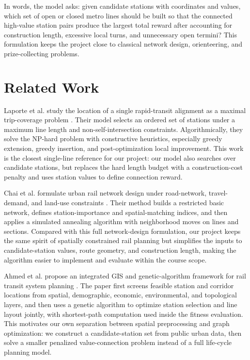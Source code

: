 \documentclass[9pt,a4paper,twocolumn,twoside]{tau-class/tau}
\begin{document}
    In words, the model asks: given candidate stations with coordinates and values, which set of open or closed metro lines should be built so that the connected high-value station pairs produce the largest total reward after accounting for construction length, excessive local turns, and unnecessary open termini? This formulation keeps the project close to classical network design, orienteering, and prize-collecting problems.

    \section{Related Work}

    Laporte et al. study the location of a single rapid-transit alignment as a maximal trip-coverage problem \cite{laporte2005tripcoverage}. Their model selects an ordered set of stations under a maximum line length and non-self-intersection constraints. Algorithmically, they solve the NP-hard problem with constructive heuristics, especially greedy extension, greedy insertion, and post-optimization local improvement. This work is the closest single-line reference for our project: our model also searches over candidate stations, but replaces the hard length budget with a construction-cost penalty and uses station values to define connection reward.

    Chai et al. formulate urban rail network design under road-network, travel-demand, and land-use constraints \cite{chai2019urbanrail}. Their method builds a restricted basic network, defines station-importance and spatial-matching indices, and then applies a simulated annealing algorithm with neighborhood moves on lines and sections. Compared with this full network-design formulation, our project keeps the same spirit of spatially constrained rail planning but simplifies the inputs to candidate-station values, route geometry, and construction length, making the algorithm easier to implement and evaluate within the course scope.

    Ahmed et al. propose an integrated GIS and genetic-algorithm framework for rail transit system planning \cite{ahmed2020gisga}. The paper first screens feasible station and corridor locations from spatial, demographic, economic, environmental, and topological layers, and then uses a genetic algorithm to optimize station selection and line layout jointly, with shortest-path computation used inside the fitness evaluation. This motivates our own separation between spatial preprocessing and graph optimization: we construct a candidate-station set from public urban data, then solve a smaller penalized value-connection problem instead of a full life-cycle planning model.
\end{document}

